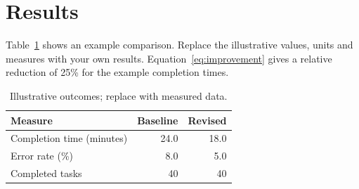 \section{Results}
Table~\ref{tab:results} shows an example comparison. Replace the illustrative values,
units and measures with your own results. Equation~\ref{eq:improvement} gives a
relative reduction of 25\% for the example completion times.
\begin{table}[htbp]
\centering
\caption{Illustrative outcomes; replace with measured data.}
\label{tab:results}
\begin{tabularx}{\linewidth}{@{}Xrr@{}}
\toprule
\textbf{Measure} & \textbf{Baseline} & \textbf{Revised}\\
\midrule
Completion time (minutes) & 24.0 & 18.0\\
Error rate (\%) & 8.0 & 5.0\\
Completed tasks & 40 & 40\\
\bottomrule
\end{tabularx}
\end{table}
